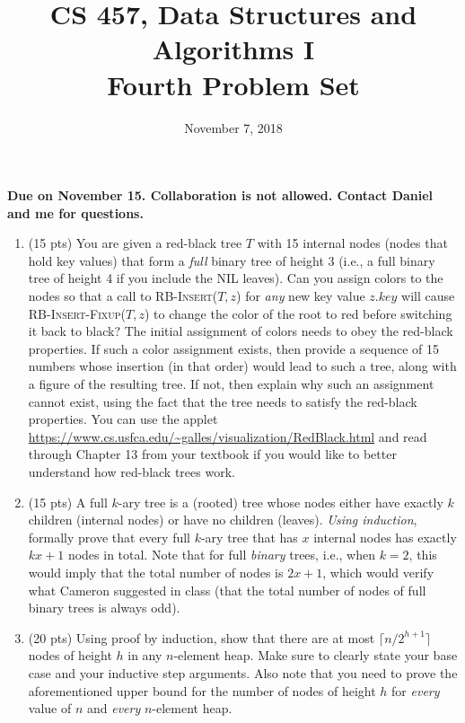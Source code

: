 \documentclass{article}
\begin{document}
\title{CS 457, Data Structures and Algorithms I\\
Fourth Problem Set}
\date{November 7, 2018}
\maketitle
\begin{center}
\textbf{Due on November 15. Collaboration is not allowed. Contact Daniel and me for questions.}
\end{center}
\begin{enumerate}


\item (15 pts) You are given a red-black tree $T$ with 15 internal nodes (nodes that hold key values) 
that form a \emph{full} binary tree of height 3 (i.e., a full binary tree of height 4 if you include 
the NIL leaves). Can you assign colors to the nodes so that a call to \textsc{RB-Insert}($T,z$) for
\emph{any} new key value $z.key$ will cause \textsc{RB-Insert-Fixup}($T,z$) to change the color of the 
root to red before switching it back to black? The initial assignment of colors needs to obey the 
red-black properties. If such a color assignment exists, then provide a sequence of 15 numbers whose 
insertion (in that order) would lead to such a tree, along with a figure of the resulting tree. If not, 
then explain why such an assignment cannot exist, using the fact that the tree needs to satisfy the 
red-black properties. You can use the applet \url{https://www.cs.usfca.edu/~galles/visualization/RedBlack.html}
and read through Chapter 13 from your textbook if you would like to better understand how red-black trees work.

\item (15 pts) A full $k$-ary tree is a (rooted) tree whose nodes either have exactly $k$ children
(internal nodes) or have no children (leaves). \emph{Using induction}, formally prove that every full 
$k$-ary tree that has $x$ internal nodes has exactly $kx+1$ nodes in total. Note that for full 
\emph{binary} trees, i.e., when $k=2$, this would imply that the total number of nodes is $2x+1$,
which would verify what Cameron suggested in class (that the total number of nodes of full binary
trees is always odd).

\item (20 pts) Using proof by induction, show that there are at most $\lceil n/2^{h+1}\rceil$ 
nodes of height $h$ in any $n$-element heap. Make sure to clearly state your base case and your
inductive step arguments. Also note that you need to prove the aforementioned upper bound for the
number of nodes of height $h$ for \emph{every} value of $n$ and \emph{every} $n$-element heap. 


\end{enumerate}
\end{document}
